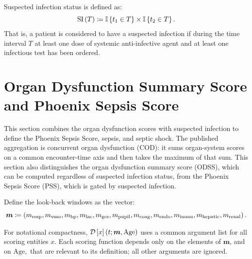 \documentclass[letterpaper,10pt]{article}
\begin{document}
Suspected infection status is defined as:
\begin{equation}
  \label{eq:suspected-infection}
  \mathrm{SI}\left(T\right) \coloneqq \mathbb{I}\left\{t_{1} \in T \right\} \times \mathbb{I}\left\{t_{2} \in T \right\}.
\end{equation}
That is, a patient is considered to have a suspected infection if during the
time interval $T$ at least one dose of systemic anti-infective agent and at
least one infectious test has been ordered.

\section{Organ Dysfunction Summary Score and Phoenix Sepsis Score}\label{define-phoenix-sepsis-score}

This section combines the organ dysfunction scores with suspected infection to
define the Phoenix Sepsis Score, sepsis, and septic shock. The published
aggregation is concurrent organ dysfunction (COD): it sums organ-system scores
on a common encounter-time axis and then takes the maximum of that sum. This
section also distinguishes the organ dysfunction summary score (ODSS), which can
be computed regardless of suspected infection status, from the Phoenix Sepsis
Score (PSS), which is gated by suspected infection.

Define the look-back windows as the vector:
\begin{equation}
  \label{eq:lookback-vector}
  \boldsymbol{m} \coloneqq \left(m_{\mathrm{resp}}, m_{\mathrm{vaso}}, m_{\mathrm{bp}}, m_{\mathrm{lac}}, m_{\mathrm{gcs}}, m_{\mathrm{pupil}}, m_{\mathrm{coag}}, m_{\mathrm{endo}}, m_{\mathrm{immu}}, m_{\mathrm{hepatic}}, m_{\mathrm{renal}}\right).
\end{equation}

For notational compactness, $\DS*{x}$ uses a common argument list for all scoring
entities $x.$ Each scoring function depends only on the elements of
$\boldsymbol{m}$, and on $\mathrm{Age},$ that are relevant to its definition;
all other arguments are ignored.
\end{document}
